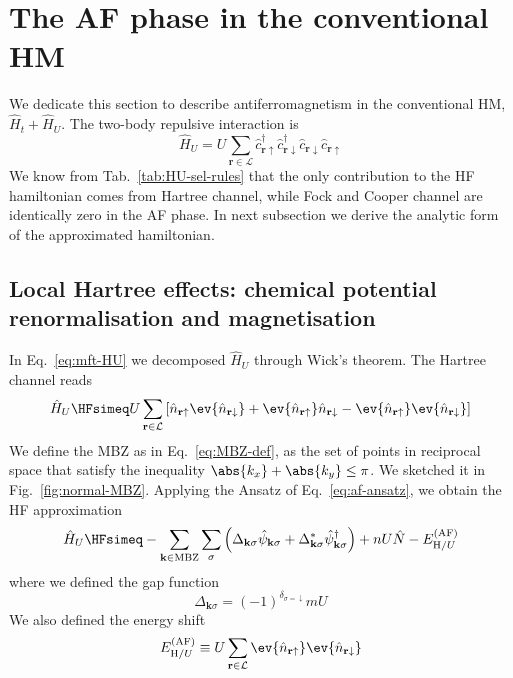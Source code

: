 \section{The AF phase in the conventional HM}\label{sec:af-hm}

We dedicate this section to describe antiferromagnetism in the conventional HM, $\hat H_t + \hat H_U$. The two-body repulsive interaction is
\[
\hat H_U = U \sum_{\mathbf{r}\in\mathcal{L}} \hat c_{\mathbf{r}\uparrow}^\dagger \hat c_{\mathbf{r}\downarrow}^\dagger \hat c_{\mathbf{r}\downarrow} \hat c_{\mathbf{r}\uparrow}
\]
We know from Tab.~\ref{tab:HU-sel-rules} that the only contribution to the HF hamiltonian comes from Hartree channel, while Fock and Cooper channel are identically zero in the AF phase. In next subsection we derive the analytic form of the approximated hamiltonian.

\subsection{Local Hartree effects: chemical potential renormalisation and magnetisation }\label{subsec:af-l-hartree}

In Eq.~\eqref{eq:mft-HU} we decomposed $\hat H_U$ through Wick's theorem. The Hartree channel reads
\begin{equation}\label{eq:af-HU-hartree-approx-implicit}
	\hat H_U \HFsimeq U \sum_{\mathbf{r}\in\mathcal{L}} \left[
	\hat n_{\mathbf{r}\uparrow} \ev{\hat n_{\mathbf{r}\downarrow}} + \ev{\hat n_{\mathbf{r}\uparrow}} \hat n_{\mathbf{r}\downarrow} - \ev{\hat n_{\mathbf{r}\uparrow}} \ev{\hat n_{\mathbf{r}\downarrow}}
	\right]
\end{equation}
We define the MBZ as in Eq.~\eqref{eq:MBZ-def}, as the set of points in reciprocal space that satisfy the inequality $\abs{k_x} + \abs{k_y} \le \pi$. We sketched it in Fig.~\ref{fig:normal-MBZ}. Applying the Ansatz of Eq.~\eqref{eq:af-ansatz}, we obtain the HF approximation
\begin{equation}\label{eq:af-HU-hartree-approx}
	\hat H_U \HFsimeq -\sum_{\mathbf{k}\in\mathrm{MBZ}} \sum_\sigma \left(
	\Delta_{\mathbf{k}\sigma} \hat \psi_{\mathbf{k}\sigma} + \Delta_{\mathbf{k}\sigma}^* \hat \psi_{\mathbf{k}\sigma}^\dagger
	\right) + nU \hat N - E_{\mathrm{H}/U}^{(\mathrm{AF})}
\end{equation}
where we defined the gap function
\begin{equation}\label{eq:af-hm-Delta-def}
	\Delta_{\mathbf{k}\sigma} = (-1)^{\delta_{\sigma=\downarrow}} mU
\end{equation}
We also defined the energy shift
\begin{equation}\label{eq:af-HU-hartree-Ec-implicit}
	E_{\mathrm{H}/U}^{(\mathrm{AF})} \equiv U \sum_{\mathbf{r}\in\mathcal{L}} \ev{\hat n_{\mathbf{r}\uparrow}} \ev{\hat n_{\mathbf{r}\downarrow}}
\end{equation}

